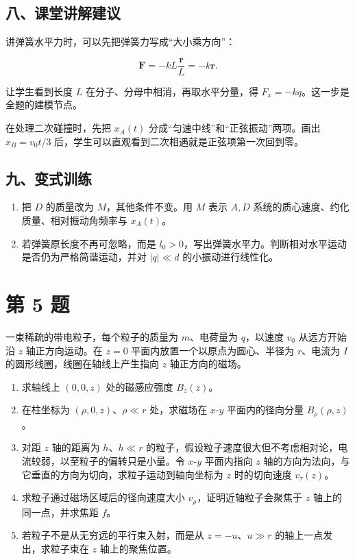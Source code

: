 \documentclass[12pt,a4paper,UTF8]{ctexart}
\newcommand{\tightlist}{\setlength{\itemsep}{0pt}\setlength{\parskip}{0pt}}
\begin{document}
\subsection{八、课堂讲解建议}\label{ux516bux8bfeux5802ux8bb2ux89e3ux5efaux8bae-3}

讲弹簧水平力时，可以先把弹簧力写成``大小乘方向''：

\[
\bm F=-kL\frac{\bm r}{L}=-k\bm r.
\]

让学生看到长度 \(L\) 在分子、分母中相消，再取水平分量，得
\(F_x=-kq\)。这一步是全题的建模节点。

在处理二次碰撞时，先把 \(x_A(t)\)
分成``匀速中线''和``正弦振动''两项。画出 \(x_B=v_0t/3\)
后，学生可以直观看到二次相遇就是正弦项第一次回到零。

\subsection{九、变式训练}\label{ux4e5dux53d8ux5f0fux8badux7ec3-3}

\begin{enumerate}
\def\labelenumi{\arabic{enumi}.}
\tightlist
\item
  把 \(D\) 的质量改为 \(M\)，其他条件不变。用 \(M\) 表示 \(A,D\)
  系统的质心速度、约化质量、相对振动角频率与 \(x_A(t)\)。
\item
  若弹簧原长度不再可忽略，而是
  \(l_0>0\)，写出弹簧水平力。判断相对水平运动是否仍为严格简谐运动，并对
  \(|q|\ll d\) 的小振动进行线性化。
\end{enumerate}

\newpage

\section{第 5 题}\label{ux7b2c-5-ux9898}

一束稀疏的带电粒子，每个粒子的质量为 \(m\)、电荷量为 \(q\)，以速度
\(v_0\) 从远方开始沿 \(z\) 轴正方向运动。在 \(z=0\)
平面内放置一个以原点为圆心、半径为 \(r\)、电流为 \(I\)
的圆形线圈，线圈在轴线上产生指向 \(z\) 轴正方向的磁场。

\begin{enumerate}
\def\labelenumi{\arabic{enumi}.}
\tightlist
\item
  求轴线上 \((0,0,z)\) 处的磁感应强度 \(B_z(z)\)。
\item
  在柱坐标为 \((\rho,0,z)\)、\(\rho\ll r\) 处，求磁场在 \(x\)-\(y\)
  平面内的径向分量 \(B_\rho(\rho,z)\)。
\item
  对距 \(z\) 轴的距离为 \(h\)、\(h\ll r\)
  的粒子，假设粒子速度很大但不考虑相对论，电流较弱，以至粒子的偏转只是小量。令
  \(x\)-\(y\) 平面内指向 \(z\)
  轴的方向为法向，与它垂直的方向为切向，求粒子运动到轴向坐标为 \(z\)
  时的切向速度 \(v_\tau(z)\)。
\item
  求粒子通过磁场区域后的径向速度大小 \(v_\rho\)，证明近轴粒子会聚焦于
  \(z\) 轴上的同一点，并求焦距 \(f\)。
\item
  若粒子不是从无穷远的平行束入射，而是从 \(z=-u\)、\(u\gg r\)
  的轴上一点发出，求粒子束在 \(z\) 轴上的聚焦位置。
\end{enumerate}
\end{document}
